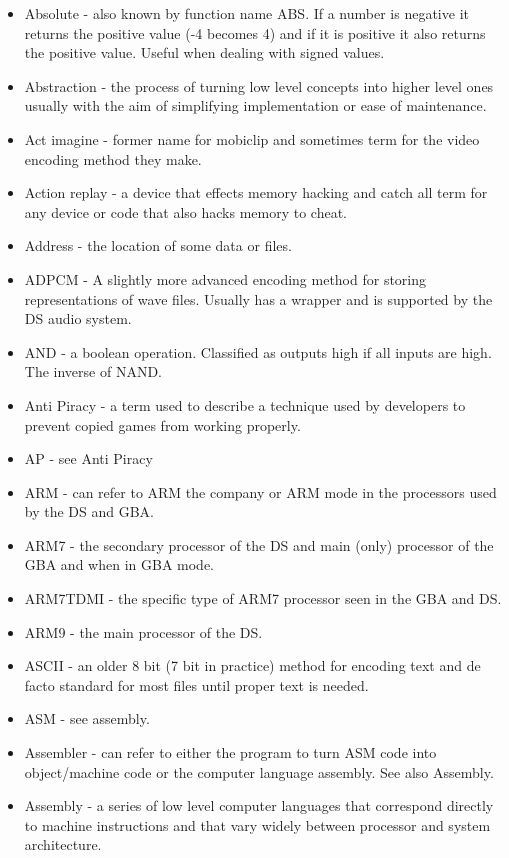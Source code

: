 \documentclass[
]{book}
\providecommand{\tightlist}{%
  \setlength{\itemsep}{0pt}\setlength{\parskip}{0pt}}
\begin{document}
\begin{itemize}
\tightlist
\item
  Absolute - also known by function name ABS. If a number is negative it returns the positive value (-4 becomes 4) and if it is positive it also returns the positive value. Useful when dealing with signed values.
\item
  Abstraction - the process of turning low level concepts into higher level ones usually with the aim of simplifying implementation or ease of maintenance.
\item
  Act imagine - former name for mobiclip and sometimes term for the video encoding method they make.
\item
  Action replay - a device that effects memory hacking and catch all term for any device or code that also hacks memory to cheat.
\item
  Address - the location of some data or files.
\item
  ADPCM - A slightly more advanced encoding method for storing representations of wave files. Usually has a wrapper and is supported by the DS audio system.
\item
  AND - a boolean operation. Classified as outputs high if all inputs are high. The inverse of NAND.
\item
  Anti Piracy - a term used to describe a technique used by developers to prevent copied games from working properly.
\item
  AP - see Anti Piracy
\item
  ARM - can refer to ARM the company or ARM mode in the processors used by the DS and GBA.
\item
  ARM7 - the secondary processor of the DS and main (only) processor of the GBA and when in GBA mode.
\item
  ARM7TDMI - the specific type of ARM7 processor seen in the GBA and DS.
\item
  ARM9 - the main processor of the DS.
\item
  ASCII - an older 8 bit (7 bit in practice) method for encoding text and de facto standard for most files until proper text is needed.
\item
  ASM - see assembly.
\item
  Assembler - can refer to either the program to turn ASM code into object/machine code or the computer language assembly. See also Assembly.
\item
  Assembly - a series of low level computer languages that correspond directly to machine instructions and that vary widely between processor and system architecture.

\end{itemize}
\end{document}
